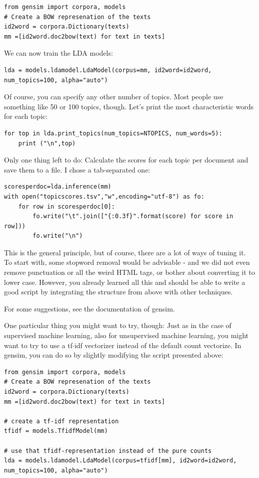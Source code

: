 \documentclass[a4paper,12pt]{book}
\begin{document}
\begin{lstlisting}
from gensim import corpora, models
# Create a BOW represenation of the texts
id2word = corpora.Dictionary(texts)
mm =[id2word.doc2bow(text) for text in texts]
\end{lstlisting}

We can now train the LDA models:
\begin{lstlisting}
lda = models.ldamodel.LdaModel(corpus=mm, id2word=id2word, num_topics=100, alpha="auto")
\end{lstlisting}

Of course, you can specify any other number of topics. Most people use something like 50 or 100 topics, though. Let's print the most characteristic words for each topic:

\begin{lstlisting}
for top in lda.print_topics(num_topics=NTOPICS, num_words=5):
    print ("\n",top)

\end{lstlisting}

Only one thing left to do: Calculate the scores for each topic per document and save them to a file. I chose a tab-separated one:

\begin{lstlisting}
scoresperdoc=lda.inference(mm)
with open("topicscores.tsv","w",encoding="utf-8") as fo:
    for row in scoresperdoc[0]:
        fo.write("\t".join(["{:0.3f}".format(score) for score in row]))
        fo.write("\n")
\end{lstlisting}

This is the general principle, but of course, there are a lot of ways of tuning it. To start with, some stopword removal would be advisable - and we did not even remove punctuation or all the weird HTML tags, or bother about converting it to lower case. However, you already learned all this and should be able to write a good script by integrating the structure from above with other techniques.

For some suggestions, see the documentation of gensim.%

One particular thing you might want to try, though: Just as in the case of supervised machine learning, also for unsupervised machine learning, you might want to try to use a tf$\cdot$idf vectorizer instead of the default count vectorize. In gensim, you can do so by slightly modifying the script presented above:


\begin{lstlisting}
from gensim import corpora, models
# Create a BOW represenation of the texts
id2word = corpora.Dictionary(texts)
mm =[id2word.doc2bow(text) for text in texts]

# create a tf-idf representation
tfidf = models.TfidfModel(mm)

# use that tfidf-representation instead of the pure counts
lda = models.ldamodel.LdaModel(corpus=tfidf[mm], id2word=id2word, num_topics=100, alpha="auto")
\end{lstlisting}
\end{document}
